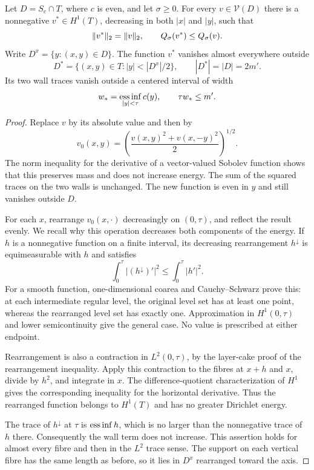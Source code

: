 \begin{lemma}\label{lem:strip-rearrangement}
Let $D=S_c\cap T$, where $c$ is even, and let $\sigma\ge0$. For every $v\in\mathcal V(D)$ there is a nonnegative $v^*\in H^1(T)$, decreasing in both $|x|$ and $|y|$, such that
\[
 \lVert v^*\rVert_2=\lVert v\rVert_2,\qquad Q_\sigma(v^*)\le Q_\sigma(v).
\]
Write $D^x=\{y:(x,y)\in D\}$. The function $v^*$ vanishes almost everywhere outside
\[
 D^*=\{(x,y)\in T:|y|<|D^x|/2\},\qquad |D^*|=|D|=2m'.
\]
Its two wall traces vanish outside a centered interval of width
\[
 w_* = \operatorname*{ess\,inf}_{|y|<\tau}c(y),\qquad \tau w_*\le m'.
\]
\end{lemma}
\begin{proof}
Replace $v$ by its absolute value and then by
\[
 v_0(x,y)=\left(\frac{v(x,y)^2+v(x,-y)^2}{2}\right)^{1/2}.
\]
The norm inequality for the derivative of a vector-valued Sobolev function shows that this preserves mass and does not increase energy. The sum of the squared traces on the two walls is unchanged. The new function is even in $y$ and still vanishes outside $D$.

For each $x$, rearrange $v_0(x,\cdot)$ decreasingly on $(0,\tau)$, and reflect the result evenly. We recall why this operation decreases both components of the energy. If $h$ is a nonnegative function on a finite interval, its decreasing rearrangement $h^\downarrow$ is equimeasurable with $h$ and satisfies
\[
 \int_0^\tau |(h^\downarrow)'|^2\le\int_0^\tau |h'|^2.
\]
For a smooth function, one-dimensional coarea and Cauchy--Schwarz prove this: at each intermediate regular level, the original level set has at least one point, whereas the rearranged level set has exactly one. Approximation in $H^1(0,\tau)$ and lower semicontinuity give the general case. No value is prescribed at either endpoint.

Rearrangement is also a contraction in $L^2(0,\tau)$, by the layer-cake proof of the rearrangement inequality. Apply this contraction to the fibres at $x+h$ and $x$, divide by $h^2$, and integrate in $x$. The difference-quotient characterization of $H^1$ gives the corresponding inequality for the horizontal derivative. Thus the rearranged function belongs to $H^1(T)$ and has no greater Dirichlet energy.

The trace of $h^\downarrow$ at $\tau$ is $\operatorname*{ess\,inf} h$, which is no larger than the nonnegative trace of $h$ there. Consequently the wall term does not increase. This assertion holds for almost every fibre and then in the $L^2$ trace sense. The support on each vertical fibre has the same length as before, so it lies in $D^x$ rearranged toward the axis.


\end{proof}
